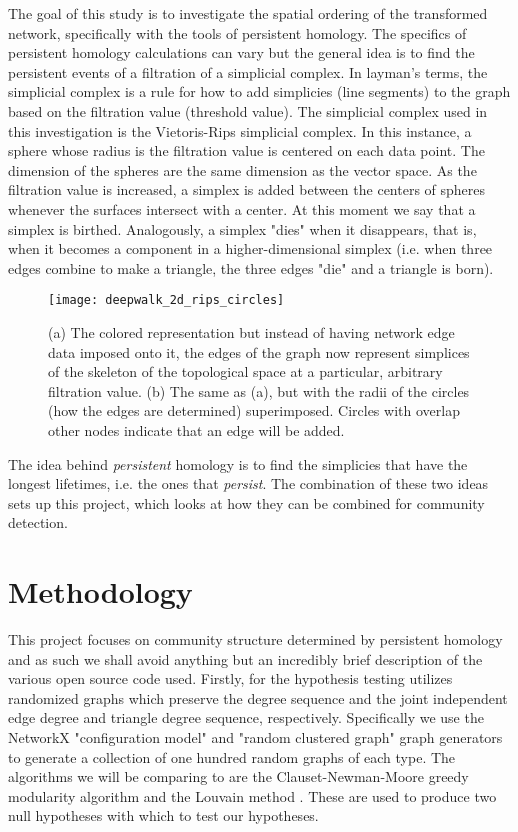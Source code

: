 \documentclass[letter,10pt,openany]{article}
\begin{document}
The goal of this study is to investigate the spatial ordering
of the transformed network, specifically with the tools of persistent homology.
The specifics of persistent homology calculations can vary but the general
idea is to find the persistent events of a filtration of a simplicial complex.
In layman's terms, the simplicial complex is a rule for how to add simplicies (line segments)
to the graph based on the filtration value (threshold value). The simplicial complex
used in this investigation is the Vietoris-Rips simplicial complex. In this instance,
a sphere whose radius is the filtration value is centered on each data point.
The dimension of the spheres are the same dimension as the vector space.
As the filtration value is increased, a simplex is added between the centers
of spheres whenever the surfaces intersect with a center. At this moment we
say that a simplex is birthed. Analogously, a simplex "dies" when it disappears,
that is, when it becomes a component in a higher-dimensional simplex (i.e. when
three edges combine to make a triangle, the three edges "die" and a triangle is born).
\begin{figure}[H]
\centering
\begin{minipage}[height=.5\textheight]{.5\textwidth}
\texttt{[image: deepwalk\_2d\_rips\_circles]}
\end{minipage}
\caption{\label{deepwalkcircles}
(a) The colored representation but instead of having network edge
data imposed onto it, the edges of the graph now represent simplices of the skeleton of the topological space at a particular, arbitrary filtration value. (b) The same as (a),
but with the radii of the circles (how the edges are determined)
superimposed. Circles with overlap other nodes indicate that an edge will be added.
}
\end{figure}
The idea behind \textit{persistent} homology is to find the simplicies that
have the longest lifetimes, i.e. the ones that \textit{persist}. The combination
of these two ideas sets up this project, which looks at how they can be combined for community
detection.

\section{Methodology}

This project focuses on community structure determined by persistent homology
and as such we shall avoid anything but an incredibly brief description of
the various open source code used.
Firstly, for the hypothesis testing utilizes randomized graphs which preserve
the degree sequence and the joint independent edge degree and triangle degree sequence,
respectively. Specifically we use the NetworkX "configuration model" and "random clustered graph"
graph generators to generate a collection of one hundred random graphs of each type.
The algorithms we will be comparing to are  the Clauset-Newman-Moore
greedy modularity algorithm \cite{greed} and the Louvain method
\cite{louvain}. These are used to produce two null hypotheses with which to test
our hypotheses.
\end{document}
